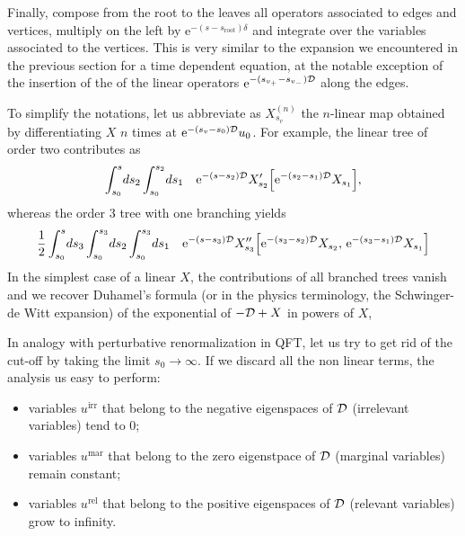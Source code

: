 \documentclass[12pt,here,feynmf]{article}
\begin{document}
Finally, compose from the root to the leaves all operators
associated to edges and vertices, multiply on the left by $\mathrm{e}^{-(s-s_{\mathrm{root}})\delta}$ and integrate over the variables associated to the vertices. This is very similar to the expansion we encountered in the previous section for a time dependent equation, at the notable exception of the insertion of the of the linear operators  $\mathrm{e}^{-(s_{v_{+}}-s_{v_{-}}){\cal D}}$ along the edges.

To simplify the notations, let us abbreviate as $X_{s_{v}}^{(n)}$ the $n$-linear map obtained by differentiating $X$ $n$ times at $\mathrm{e}^{-(s_{v}-s_{0}){\cal D}}  u_{0}$. For example, the linear tree of order two contributes as
\begin{equation}
\int_{s_{0}}^{s}\! ds_{2}\int_{s_{0}}^{s_{2}}\! ds_{1} \quad
\mathrm{e}^{-(s-s_{2}){\cal D}}
X'_{s_{2}}
\Big[\mathrm{e}^{-(s_{2}-s_{1}){\cal D}} X_{s_{1}}\Big],
\end{equation}
whereas the order 3 tree with one branching yields
\begin{equation}
\frac{1}{2}
\int_{s_{0}}^{s}\! ds_{3}\int_{s_{0}}^{s_{3}}\! ds_{2} 
\int_{s_{0}}^{s_{3}}\! ds_{1} 
\quad
\mathrm{e}^{-(s-s_{3}){\cal D}}
X''_{s_{3}}
\Big[\mathrm{e}^{-(s_{3}-s_{2}){\cal D}} X_{s_{2}},\,
\mathrm{e}^{-(s_{3}-s_{1}){\cal D}} X_{s_{1}}
\Big]
\end{equation}
In the simplest case of a linear $X$, the contributions of all branched trees vanish and we recover Duhamel's formula (or in the physics terminology, the Schwinger-de Witt expansion) of the exponential of $-{\cal D}+X$ in powers of $X$,

In analogy with perturbative renormalization in QFT, let us try to get rid of the cut-off by taking the limit $s_{0}\rightarrow\infty$. If we discard all the non linear terms, the analysis us easy to perform: 

\begin{itemize}
\item
variables $u^{\mathrm{irr}}$ that belong to the negative eigenspaces of ${\cal D}$ (irrelevant variables) tend to $0$;
\item
variables $u^{\mathrm{mar}}$ that belong to the zero eigenstpace of ${\cal D}$ (marginal variables) remain constant;
\item
variables $u^{\mathrm{rel}}$ that belong to the positive eigenspaces of ${\cal D}$ (relevant variables) grow to infinity.
\end{itemize}
\end{document}
